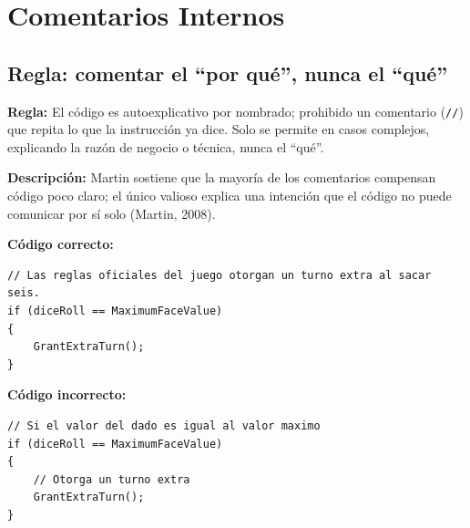\section{Comentarios Internos}

\subsection{Regla: comentar el ``por qué'', nunca el ``qué''}

\textbf{Regla:} El código es autoexplicativo por nombrado; prohibido un comentario (\texttt{//}) que repita lo que la instrucción ya dice. Solo se permite en casos complejos, explicando la razón de negocio o técnica, nunca el ``qué''.

\textbf{Descripción:} Martin sostiene que la mayoría de los comentarios compensan código poco claro; el único valioso explica una intención que el código no puede comunicar por sí solo (Martin, 2008).

\textbf{Código correcto:}
\begin{lstlisting}[style=csharpstyle]
// Las reglas oficiales del juego otorgan un turno extra al sacar seis.
if (diceRoll == MaximumFaceValue)
{
    GrantExtraTurn();
}
\end{lstlisting}

\textbf{Código incorrecto:}
\begin{lstlisting}[style=csharpstyle]
// Si el valor del dado es igual al valor maximo
if (diceRoll == MaximumFaceValue)
{
    // Otorga un turno extra
    GrantExtraTurn();
}
\end{lstlisting}
